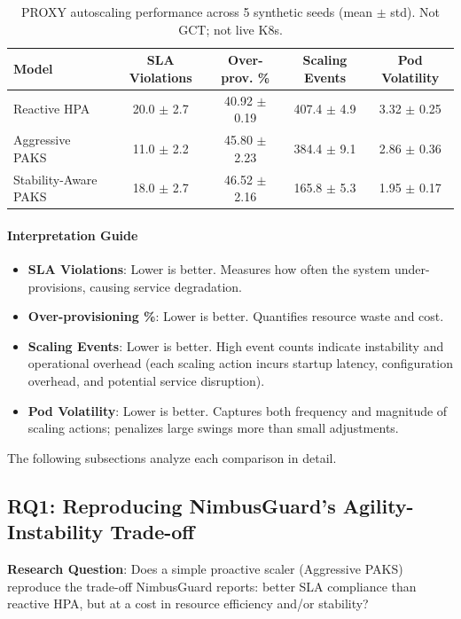 \begin{table}[htp]
\centering
\caption{PROXY autoscaling performance across 5 synthetic seeds (mean $\pm$ std). Not GCT; not live K8s.}
\label{tab:results}
\begin{tabular}{lcccc}
\hline
\textbf{Model} & \textbf{SLA Violations} & \textbf{Over-prov. \%} & \textbf{Scaling Events} & \textbf{Pod Volatility} \\
\hline
Reactive HPA & 20.0 $\pm$ 2.7 & 40.92 $\pm$ 0.19 & 407.4 $\pm$ 4.9 & 3.32 $\pm$ 0.25 \\
Aggressive PAKS & 11.0 $\pm$ 2.2 & 45.80 $\pm$ 2.23 & 384.4 $\pm$ 9.1 & 2.86 $\pm$ 0.36 \\
Stability-Aware PAKS & 18.0 $\pm$ 2.7 & 46.52 $\pm$ 2.16 & 165.8 $\pm$ 5.3 & 1.95 $\pm$ 0.17 \\
\hline
\end{tabular}
\end{table}

\paragraph{Interpretation Guide}
\begin{itemize}
  \item \textbf{SLA Violations}: Lower is better. Measures how often the system under-provisions, causing service degradation.
  \item \textbf{Over-provisioning \%}: Lower is better. Quantifies resource waste and cost.
  \item \textbf{Scaling Events}: Lower is better. High event counts indicate instability and operational overhead (each scaling action incurs startup latency, configuration overhead, and potential service disruption).
  \item \textbf{Pod Volatility}: Lower is better. Captures both frequency and magnitude of scaling actions; penalizes large swings more than small adjustments.
\end{itemize}

The following subsections analyze each comparison in detail.

\subsection{RQ1: Reproducing NimbusGuard's Agility-Instability Trade-off}
\label{sec:evalOne}

\textbf{Research Question}: Does a simple proactive scaler (Aggressive PAKS) reproduce the trade-off NimbusGuard reports: better SLA compliance than reactive HPA, but at a cost in resource efficiency and/or stability?

